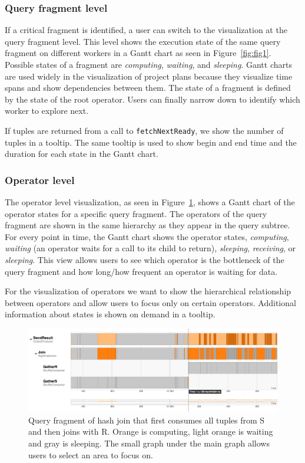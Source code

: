 \documentclass[11pt]{scrartcl}
\begin{document}
\subsubsection{Query fragment level}

If a critical fragment is identified, a user can switch to the visualization at the query fragment level. This level shows the execution state of the same query fragment on different workers in a Gantt chart as seen in Figure~\ref{fig:fig1}. Possible states of a fragment are \emph{computing}, \emph{waiting}, and \emph{sleeping}. Gantt charts are used widely in the visualization of project plans because they visualize time spans and show dependencies between them. The state of a fragment is defined by the state of the root operator. Users can finally narrow down to identify which worker to explore next.

If tuples are returned from a call to \texttt{fetchNextReady}, we show the number of tuples in a tooltip. The same tooltip is used to show begin and end time and the duration for each state in the Gantt chart.

\subsubsection{Operator level}

The operator level visualization, as seen in Figure~\ref{fig:gantt}, shows a Gantt chart of the operator states for a specific query fragment. The operators of the query fragment are shown in the same hierarchy as they appear in the query subtree. For every point in time, the Gantt chart shows the operator states, \emph{computing}, \emph{waiting} (an operator waits for a call to its child to return), \emph{sleeping}, \emph{receiving}, or \emph{sleeping}. This view allows users to see which operator is the bottleneck of the query fragment and how long/how frequent an operator is waiting for data.

For the visualization of operators we want to show the hierarchical relationship between operators and allow users to focus only on certain operators. Additional information about states is shown on demand in a tooltip.

\begin{figure}[h]
  \begin{center}
    \includegraphics[width=\textwidth]{join_gantt}
  \end{center}
  \caption{Query fragment of hash join that first consumes all tuples from S and then joins with R. Orange is computing, light orange is waiting and gray is sleeping. The small graph under the main graph allows users to select an area to focus on.}
  \label{fig:gantt}
\end{figure}
\end{document}
